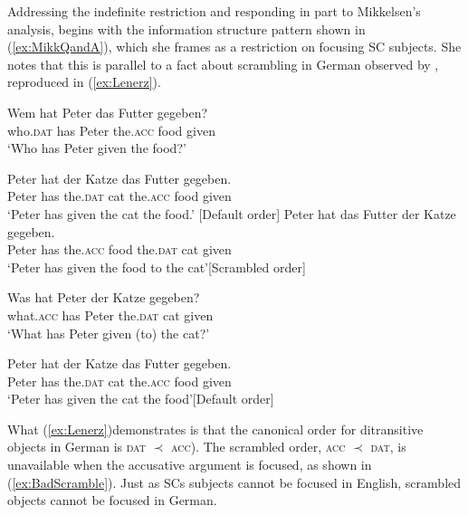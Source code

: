 \documentclass[
	letterpaper,
]{article}
\begin{document}
Addressing the indefinite restriction and responding in part to Mikkelsen's analysis, \textcite{heycock2012specification} begins with the information structure pattern shown in (\ref{ex:MikkQandA}), which she frames as a restriction on focusing SC subjects.
She notes that this is parallel to a fact about scrambling in German observed by \textcite{lenerz1977zur}, reproduced in (\ref{ex:Lenerz}).
\begin{exe}\label{ex:Lenerz} 
	\ex
	\begin{xlist}
		\ex \gll Wem hat Peter das Futter gegeben?\\
			who.\textsc{dat} has Peter the.\textsc{acc} food given\\
		\trans `Who has Peter given the food?'
		\begin{xlist}
			\ex \gll Peter hat der Katze das Futter gegeben.\\
				Peter has the.\textsc{dat} cat the.\textsc{acc} food given\\
			\trans `Peter has given the cat the food.' \hfill[Default order]
			\ex \gll Peter hat das Futter der Katze gegeben.\\
			Peter has the.\textsc{acc} food the.\textsc{dat} cat given\\
			\trans `Peter has given the food to the cat'\hfill[Scrambled order]	
		\end{xlist}
		\ex \gll Was hat Peter der Katze gegeben?\\
			what.\textsc{acc} has Peter the.\textsc{dat} cat given\\
		\trans `What has Peter given (to) the cat?'
		\begin{xlist}
			\ex \gll Peter hat der Katze das Futter gegeben.\\
			Peter has the.\textsc{dat} cat the.\textsc{acc} food given\\
			\trans `Peter has given the cat the food'\hfill[Default order]
			\label{ex:BadScramble} 

		\end{xlist}
	\end{xlist}
\end{exe}
What (\ref{ex:Lenerz})demonstrates is that the canonical order for ditransitive objects in German is \textsc{dat} $\prec$ \textsc{acc}).
The scrambled order, \textsc{acc} $\prec$ \textsc{dat}, is unavailable when the accusative argument is focused, as shown in (\ref{ex:BadScramble}). 
Just as SCs subjects cannot be focused in English, scrambled objects cannot be focused in German.
\end{document}
